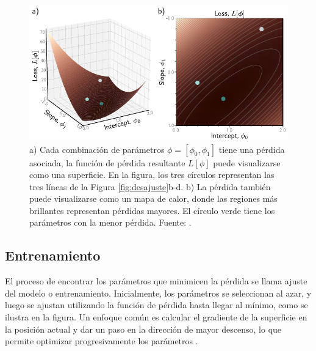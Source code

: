 	
	\begin{figure}[h!]
		\centering
		\includegraphics[width=0.7\linewidth]{graficos/loss}
		\caption[Visualización de la función de perdida.]{a) Cada combinación de parámetros $\phi = [\phi_0, \phi_1]$ tiene una pérdida asociada, la función de pérdida resultante $L[\phi]$ puede visualizarse como una superficie. En la figura, los tres círculos representan las tres líneas de la Figura \ref{fig:desajuste}b-d. b) La pérdida también puede visualizarse como un mapa de calor, donde las regiones más brillantes representan pérdidas mayores. El círculo verde tiene los parámetros con la menor pérdida. Fuente: \parencite{prince2023understanding}.}
		\label{fig:loss}
	\end{figure}
	
	
	
	
	
	\subsection{Entrenamiento}
	El proceso de encontrar los parámetros que minimicen la pérdida se llama ajuste del modelo o entrenamiento. Inicialmente, los parámetros se seleccionan al azar, y luego se ajustan utilizando la función de pérdida hasta llegar al mínimo, como se ilustra en la figura. Un enfoque común es calcular el gradiente de la superficie en la posición actual y dar un paso en la dirección de mayor descenso, lo que permite optimizar progresivamente los parámetros \parencite{prince2023understanding}. 
	
